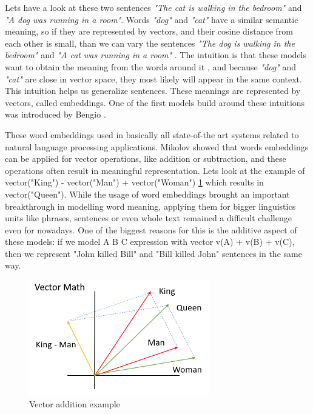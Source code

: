 Lets have a look at these two sentences \textit{"The cat is walking in the bedroom"} and \textit{"A dog was running in a room"}. Words \textit{"dog"} and \textit{"cat"} have a similar semantic meaning, so if they are represented by vectors, and their cosine distance from each other is small, than we can vary the sentences \textit{"The dog is walking in the bedroom"} and \textit{"A cat was running in a room"} \cite{Bengio:2003}. The intuition is that these models want to obtain the meaning from the words around it \cite{Jurafsky:2018}, and because \textit{"dog"} and \textit{"cat"} are close in vector space, they most likely will appear in the same context. This intuition helps us generalize sentences. These meanings are represented by vectors, called embeddings. One of the first models build around these intuitions was introduced by Bengio \cite{Bengio:2003}. 

These word embeddings used in basically all state-of-the art systems related to natural language processing applications. Mikolov \cite{Mikolov:2013c} showed that words embeddings can be applied for vector operations, like addition or subtraction, and these operations often result in meaningful representation. Lets look at the example of vector("King") - vector("Man") + vector("Woman") \ref{fig:vecs} which results in vector("Queen"). While the usage of word embeddings brought an important breakthrough in modelling word meaning, applying them for bigger linguistics units like phrases, sentences or even whole text remained a difficult challenge even for nowadays. One of the biggest reasons for this is the additive aspect of these models: if we model A B C expression with vector v(A) + v(B) + v(C), then we represent "John killed Bill" and "Bill killed John" sentences in the same way. 

\begin{figure}[h!]
	\centering
	\includegraphics[width=0.7\textwidth]{figures/vecs}
	\caption{Vector addition example}
	\label{fig:vecs}
\end{figure}

